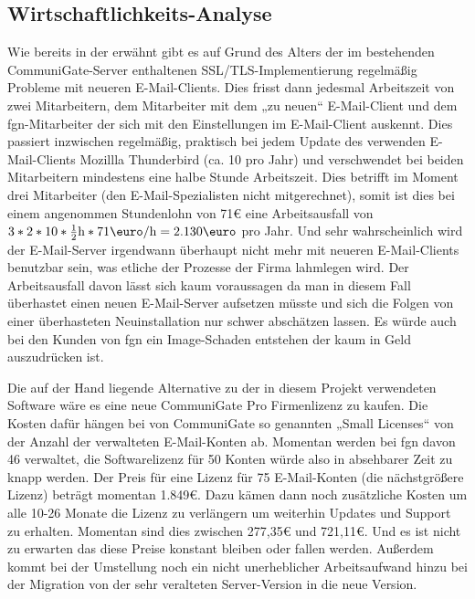 \documentclass[11pt,a4paper,titlepage=firstiscover,headsepline,bibtotoc]{scrartcl} %
\begin{document}
\subsection{Wirtschaftlichkeits-Analyse}\label{sec:Erwin}
Wie bereits in der  erwähnt gibt es auf Grund des Alters der im bestehenden CommuniGate-Server enthaltenen SSL/TLS-Implementierung regelmäßig Probleme mit neueren E-Mail-Clients. Dies frisst dann jedesmal Arbeitszeit von zwei Mitarbeitern, dem Mitarbeiter mit dem „zu neuen“ E-Mail-Client und dem fgn-Mitarbeiter der sich mit den Einstellungen im E-Mail-Client auskennt. Dies passiert inzwischen regelmäßig, praktisch bei jedem Update des verwenden E-Mail-Clients Mozillla Thunderbird (ca. 10 pro Jahr) und verschwendet bei beiden Mitarbeitern mindestens eine halbe Stunde Arbeitszeit. Dies betrifft im Moment drei Mitarbeiter (den E-Mail-Spezialisten nicht mitgerechnet), somit ist dies bei einem angenommen Stundenlohn von 71\mbox{\euro} eine Arbeitsausfall von \(3*2*10*\frac{1}{2}\mbox{h}*71\mbox{\euro}/\mbox{h}=2.130\mbox{\euro}\) pro Jahr. Und sehr wahrscheinlich wird der E-Mail-Server irgendwann überhaupt nicht mehr mit neueren E-Mail-Clients benutzbar sein, was etliche der Prozesse der Firma lahmlegen wird. Der Arbeitsausfall davon lässt sich kaum voraussagen da man in diesem Fall überhastet einen neuen E-Mail-Server aufsetzen müsste und sich die Folgen von einer überhasteten Neuinstallation nur schwer abschätzen lassen. Es würde auch bei den Kunden von fgn ein Image-Schaden entstehen der kaum in Geld auszudrücken ist.

Die auf der Hand liegende Alternative zu der in diesem Projekt verwendeten Software wäre es eine neue CommuniGate Pro Firmenlizenz zu kaufen. Die Kosten dafür hängen bei von CommuniGate so genannten „Small Licenses“ von der Anzahl der verwalteten E-Mail-Konten ab. Momentan werden bei fgn davon 46 verwaltet, die Softwarelizenz für 50 Konten würde also in absehbarer Zeit zu knapp werden. Der Preis für eine Lizenz für 75 E-Mail-Konten (die nächstgrößere Lizenz) beträgt momentan 1.849\euro. Dazu kämen dann noch zusätzliche Kosten um alle 10-26 Monate die Lizenz zu verlängern um weiterhin Updates und Support zu erhalten. Momentan sind dies zwischen 277,35\euro{} und 721,11\euro. Und es ist nicht zu erwarten das diese Preise konstant bleiben oder fallen werden. Außerdem kommt bei der Umstellung noch ein nicht unerheblicher Arbeitsaufwand hinzu bei der Migration von der sehr veralteten Server-Version in die neue Version.
\end{document}
